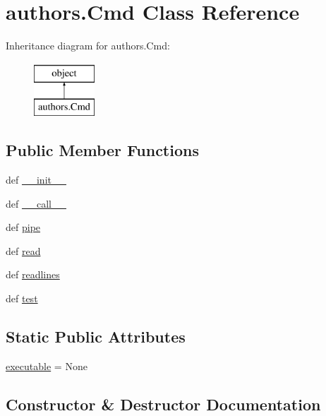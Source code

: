 \hypertarget{classauthors_1_1Cmd}{}\section{authors.\+Cmd Class Reference}
\label{classauthors_1_1Cmd}
Inheritance diagram for authors.\+Cmd\+:\begin{figure}[H]
\begin{center}
\leavevmode
\includegraphics[height=2.000000cm]{classauthors_1_1Cmd}
\end{center}
\end{figure}
\subsection*{Public Member Functions}
\begin{DoxyCompactItemize}
\item 
def \hyperlink{classauthors_1_1Cmd_a0525907b2b9749af65eec8cfcc969a55}{\+\_\+\+\_\+init\+\_\+\+\_\+}
\item 
def \hyperlink{classauthors_1_1Cmd_ac31fdd93b6c8bb3ab5e5c07349bdc583}{\+\_\+\+\_\+call\+\_\+\+\_\+}
\item 
def \hyperlink{classauthors_1_1Cmd_a375672156d2f2e539b488a446d245cef}{pipe}
\item 
def \hyperlink{classauthors_1_1Cmd_a9f6f9353b523bd020b25c66a90decf18}{read}
\item 
def \hyperlink{classauthors_1_1Cmd_a48277e6807e058b0d376df840e899f0f}{readlines}
\item 
def \hyperlink{classauthors_1_1Cmd_abefad4281c3c344d82441629d80d948d}{test}
\end{DoxyCompactItemize}
\subsection*{Static Public Attributes}
\begin{DoxyCompactItemize}
\item 
\hyperlink{classauthors_1_1Cmd_a7e745acf7d354dbd290f9f37f349e36d}{executable} = None
\end{DoxyCompactItemize}


\subsection{Constructor \& Destructor Documentation}
\hypertarget{classauthors_1_1Cmd_a0525907b2b9749af65eec8cfcc969a55}{}

